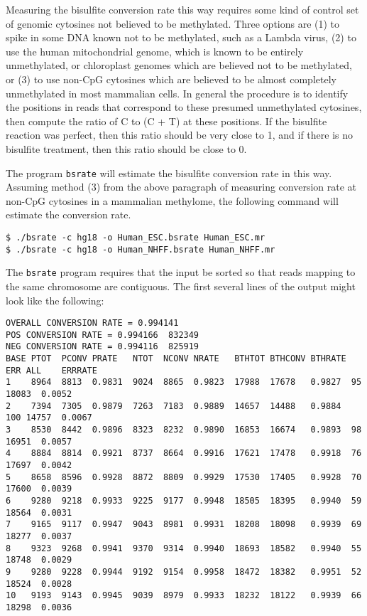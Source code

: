 \documentclass[10pt]{article}
\newcommand{\prog}[1]{\texttt{#1}}
\begin{document}
Measuring the bisulfite conversion rate this way requires some kind of
control set of genomic cytosines not believed to be methylated. Three
options are (1) to spike in some DNA known not to be methylated, such
as a Lambda virus, (2) to use the human mitochondrial genome, which
is known to be entirely unmethylated, or chloroplast genomes
which are believed not to be methylated, or (3) to use non-CpG cytosines
which are believed to be almost completely unmethylated in most
mammalian cells. In general the procedure is to identify the positions
in reads that correspond to these presumed unmethylated cytosines,
then compute the ratio of C to (C + T) at these positions. If the
bisulfite reaction was perfect, then this ratio should be very close
to 1, and if there is no bisulfite treatment, then this ratio should
be close to 0.

The program \prog{bsrate} will estimate the bisulfite conversion rate
in this way. Assuming method (3) from the above paragraph of measuring
conversion rate at non-CpG cytosines in a mammalian methylome, the
following command will estimate the conversion rate.
\begin{verbatim}
$ ./bsrate -c hg18 -o Human_ESC.bsrate Human_ESC.mr
$ ./bsrate -c hg18 -o Human_NHFF.bsrate Human_NHFF.mr
\end{verbatim}
The \prog{bsrate} program requires that the input be sorted so that
reads mapping to the same chromosome are contiguous. The first several
lines of the output might look like the following:
{\small{%
\begin{verbatim}
OVERALL CONVERSION RATE = 0.994141
POS CONVERSION RATE = 0.994166  832349
NEG CONVERSION RATE = 0.994116  825919
BASE PTOT  PCONV PRATE   NTOT  NCONV NRATE   BTHTOT BTHCONV BTHRATE ERR ALL    ERRRATE
1    8964  8813  0.9831  9024  8865  0.9823  17988  17678   0.9827  95  18083  0.0052
2    7394  7305  0.9879  7263  7183  0.9889  14657  14488   0.9884  100 14757  0.0067
3    8530  8442  0.9896  8323  8232  0.9890  16853  16674   0.9893  98  16951  0.0057
4    8884  8814  0.9921  8737  8664  0.9916  17621  17478   0.9918  76  17697  0.0042
5    8658  8596  0.9928  8872  8809  0.9929  17530  17405   0.9928  70  17600  0.0039
6    9280  9218  0.9933  9225  9177  0.9948  18505  18395   0.9940  59  18564  0.0031
7    9165  9117  0.9947  9043  8981  0.9931  18208  18098   0.9939  69  18277  0.0037
8    9323  9268  0.9941  9370  9314  0.9940  18693  18582   0.9940  55  18748  0.0029
9    9280  9228  0.9944  9192  9154  0.9958  18472  18382   0.9951  52  18524  0.0028
10   9193  9143  0.9945  9039  8979  0.9933  18232  18122   0.9939  66  18298  0.0036
\end{verbatim}%
}}
\end{document}
